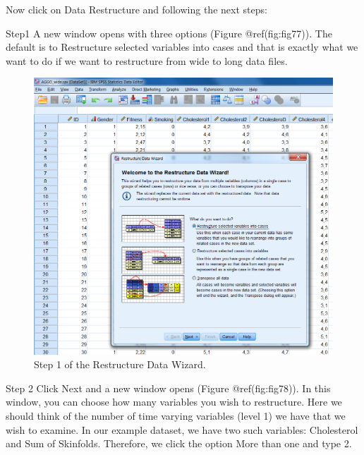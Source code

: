 \documentclass[
]{book}
\begin{document}
Now click on Data Restructure and following the next steps:

Step1 A new window opens with three options (Figure @ref(fig:fig77)).
The default is to Restructure selected variables into cases and that is
exactly what we want to do if we want to restructure from wide to long
data files.

\begin{figure}

{\centering \includegraphics[width=0.9\linewidth]{images/fig7.7} 

}

\caption{Step 1 of the Restructure Data Wizard.}\label{fig:fig77}
\end{figure}

Step 2 Click Next and a new window opens (Figure @ref(fig:fig78)). In
this window, you can choose how many variables you wish to restructure.
Here we should think of the number of time varying variables (level 1)
we have that we wish to examine. In our example dataset, we have two
such variables: Cholesterol and Sum of Skinfolds. Therefore, we click
the option More than one and type 2.
\end{document}
